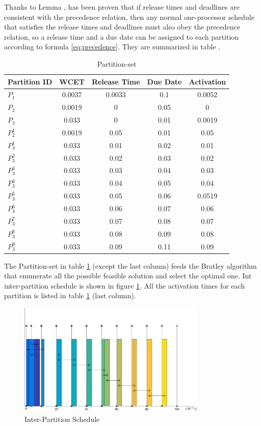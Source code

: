 Thanks to Lemma \label{eq:precedenceLemma}, has been proven that if release times and deadlines are consistent with the precedence relation, then any normal one-processor schedule that satisfies the release times and deadlines must also obey the precedence relation, so a release time and a due date can be assigned to each partition according to formula \ref{eq:precedence}. They are summarized in table \label{tab:partitionset}.

\begin{table}
\begin{center}
\begin{tabular}{lcccc}  
\toprule
Partition ID & WCET &  Release Time & Due Date & Activation \\
\midrule
$P_1$ & 0.0037 & 0.0033 & 0.1 &0.0052\\
$P_2$ & 0.0019 & 0 & 0.05 & 0\\
$P_3$ & 0.033 & 0 & 0.01 & 0.0019\\
$P_2^1$ & 0.0019 & 0.05 & 0.01 & 0.05\\
$P_3^1$ & 0.033 & 0.01 & 0.02 & 0.01\\
$P_3^2$ & 0.033 & 0.02 & 0.03 & 0.02\\
$P_3^3$ & 0.033 & 0.03 & 0.04 & 0.03\\
$P_3^4$ & 0.033 & 0.04 & 0.05 & 0.04\\
$P_3^5$ & 0.033 & 0.05 & 0.06 & 0.0519\\
$P_3^6$ & 0.033 & 0.06 & 0.07 & 0.06\\ 
$P_3^7$ & 0.033 & 0.07 & 0.08 & 0.07\\
$P_3^8$ & 0.033 & 0.08 & 0.09 & 0.08\\ 
$P_3^9$ & 0.033 & 0.09 & 0.11 & 0.09\\
\bottomrule
\end{tabular}
\caption {Partition-set}
\label{tab:partitionset}
\end{center}
\end{table}

The Partition-set in table \ref{tab:partitionset} (except the last column) feeds the Bratley algorithm that enumerate all the possible feasible solution and select the optimal one. Int inter-partition schedule is shown in figure \ref{fig:inter}. All the activation times for each partition is listed in table \ref{tab:partitionset} (last column).
\begin{figure}[htbp] 
\centering    
\includegraphics[width=0.8\textwidth]{inter}
\caption{Inter-Partition Schedule}
\label{fig:inter}
\end{figure}

